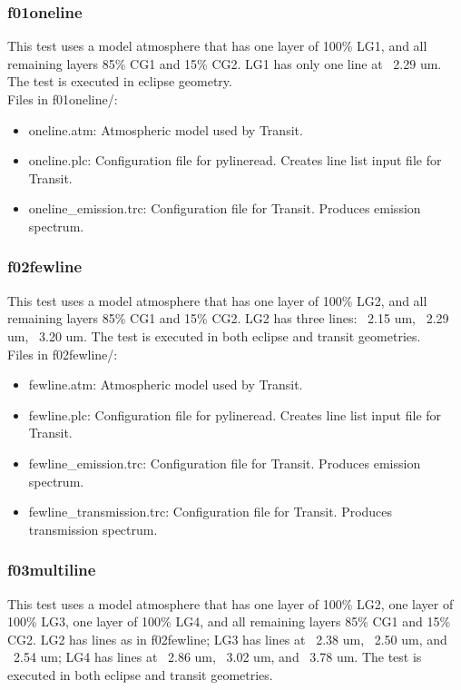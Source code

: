 \documentclass[letterpaper, 12pt]{article}
\begin{document}
\subsubsection{f01oneline}
\label{sec:oneline}
This test uses a model atmosphere that has one layer of 100\% LG1, and all 
remaining layers 85\% CG1 and 15\% CG2. LG1 has only one line at ~2.29 um. 
The test is executed in eclipse geometry.\\

Files in f01oneline/:
\begin{itemize} \itemsep0pt
  \item oneline.atm: Atmospheric model used by Transit.
  \item oneline.plc: Configuration file for pylineread. Creates line 
        list input file for Transit.
  \item oneline{\_}emission.trc: Configuration file for Transit. Produces 
        emission spectrum.
\end{itemize}

\subsubsection{f02fewline}
\label{sec:fewline}
This test uses a model atmosphere that has one layer of 100\% LG2, and all 
remaining layers 85\% CG1 and 15\% CG2. LG2 has three lines: ~2.15 um, 
~2.29 um, ~3.20 um. The test is executed in both eclipse and transit 
geometries.\\

Files in f02fewline/:
\begin{itemize} \itemsep0pt
  \item fewline.atm: Atmospheric model used by Transit.
  \item fewline.plc: Configuration file for pylineread. Creates line 
        list input file for Transit.
  \item fewline{\_}emission.trc: Configuration file for Transit. Produces 
        emission spectrum.
  \item fewline{\_}transmission.trc: Configuration file for Transit. Produces 
        transmission spectrum.
\end{itemize}

\subsubsection{f03multiline}
\label{sec:multiline}
This test uses a model atmosphere that has one layer of 100\% LG2, one layer 
of 100\% LG3, one layer of 100\% LG4, and all remaining layers 85\% CG1 and 
15\% CG2. LG2 has lines as in f02fewline; LG3 has lines at ~2.38 um, ~2.50 um, 
and ~2.54 um; LG4 has lines at ~2.86 um, ~3.02 um, and ~3.78 um. The test is 
executed in both eclipse and transit geometries.\\
\end{document}
